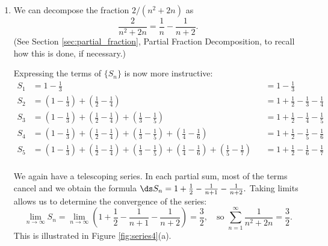{\begin{enumerate}
\item		We can decompose the fraction $2/(n^2+2n)$ as $$\frac2{n^2+2n} = \frac1n-\frac1{n+2}.$$ (See Section \ref{sec:partial_fraction}, Partial Fraction Decomposition, to recall how  this is done, if necessary.)

Expressing the terms of $\{S_n\}$ is now more instructive:
\footnotesize
\begin{align*}
S_1 &= 1-\frac13 &&= 1-\frac13\\
S_2 &= \left(1-\frac13\right) + \left(\frac12-\frac14\right) &&= 1+\frac12-\frac13-\frac14\\
S_3 &= \left(1-\frac13\right) + \left(\frac12-\frac14\right)+\left(\frac13-\frac15\right) &&= 1+\frac12-\frac14-\frac15\\
S_4 &= \left(1-\frac13\right) + \left(\frac12-\frac14\right)+\left(\frac13-\frac15\right)+\left(\frac14-\frac16\right) &&= 1+\frac12-\frac15-\frac16\\
S_5 &= \left(1-\frac13\right) + \left(\frac12-\frac14\right)+\left(\frac13-\frac15\right)+\left(\frac14-\frac16\right)+\left(\frac15-\frac17\right) &&= 1+\frac12-\frac16-\frac17\\
\end{align*}
\normalsize

\drawexampleline
We again have a telescoping series. In each partial sum, most of the terms cancel and we obtain the formula $\ds S_n = 1+\frac12-\frac1{n+1}-\frac1{n+2}.$ Taking limits allows us to determine the convergence of the series:
$$\lim_{n\to\infty}S_n = \lim_{n\to\infty} \left(1+\frac12-\frac1{n+1}-\frac1{n+2}\right) = \frac32,\quad \text{so } \sum_{n=1}^\infty \frac1{n^2+2n} = \frac32.$$
This is illustrated in Figure \ref{fig:series4}(a).


\end{enumerate}}
